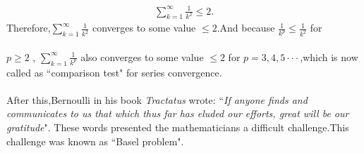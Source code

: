\documentclass[a4paper,reqno,11pt]{book}
\theoremstyle{plain}%
\theoremstyle{definition}
\begin{document}
\begin{eqnarray*}
    \sum_{k=1}^{\infty}\frac{1}{k^2}\leq2.
\end{eqnarray*}
Therefore,$\sum_{k=1}^{\infty}\frac{1}{k^2}$ converges to some value $\leq2$.And because $\frac{1}{k^p}\leq\frac{1}{k^2}$ for\\
\\$p\geq2$ , $\sum_{k=1}^{\infty}\frac{1}{k^p}$ also converges to some value $\leq2$ for $p=3,4,5\cdot\cdot\cdot$,which is now called as ``comparison test" for series convergence.\\
\\
After this,Bernoulli in his book \textit{Tractatus} wrote:
    ``\textit{If anyone finds and communicates to us that which thus far has eluded our efforts, great will be our gratitude}".
These words presented the mathematicians a difficult challenge.This challenge was known as ``Basel problem".
\end{document}
